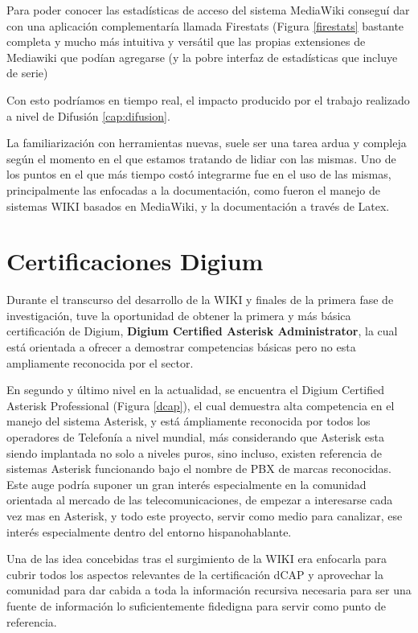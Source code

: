 Para poder conocer las estadísticas de acceso del sistema MediaWiki conseguí dar con una aplicación complementaría llamada Firestats \cite{website:firestats} (Figura \ref{firestats} bastante completa y mucho más intuitiva y versátil que las propias extensiones de Mediawiki que podían agregarse (y la pobre interfaz de estadísticas que incluye de serie) \cite{website:wikifirestats}

Con esto podríamos en tiempo real, el impacto producido por el trabajo realizado a nivel de Difusión \ref{cap:difusion}.

La familiarización con herramientas nuevas, suele ser una tarea ardua y compleja según el momento en el que estamos tratando de lidiar con las mismas.
Uno de los puntos en el que más tiempo costó integrarme fue en el uso de las mismas, principalmente las enfocadas a la documentación, como fueron el manejo de sistemas WIKI basados en MediaWiki, y la documentación a través de Latex. 


\section*{Certificaciones Digium}

Durante el transcurso del desarrollo de la WIKI y finales de la primera fase de investigación, tuve la oportunidad de obtener la primera y más básica certificación de Digium, \textbf{Digium Certified Asterisk Administrator}, la cual está orientada a ofrecer a demostrar competencias básicas pero no esta ampliamente reconocida por el sector.

En segundo y último nivel en la actualidad, se encuentra el Digium Certified Asterisk Professional (Figura \ref{dcap}), el cual demuestra alta competencia en el manejo del sistema Asterisk, y está ámpliamente reconocida por todos los operadores de Telefonía a nivel mundial, más considerando que Asterisk esta siendo implantada no solo a niveles puros, sino incluso, existen referencia de sistemas Asterisk funcionando bajo el nombre de PBX de marcas reconocidas. Este auge podría suponer un gran interés especialmente en la comunidad orientada al mercado de las telecomunicaciones, de empezar a interesarse cada vez mas en Asterisk, y todo este proyecto, servir como medio para canalizar, ese interés especialmente dentro del entorno hispanohablante.

Una de las idea concebidas tras el surgimiento de la WIKI era enfocarla para cubrir todos los aspectos relevantes de la certificación dCAP y aprovechar la comunidad para dar cabida a toda la información  recursiva necesaria para ser una fuente de información lo suficientemente fidedigna para servir como punto de referencia.

